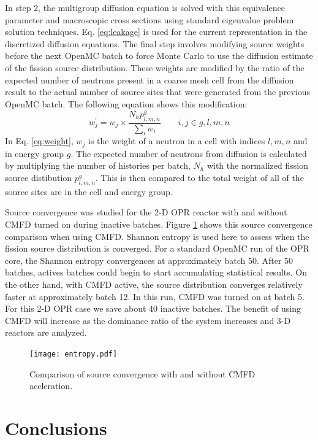 \documentclass{ansconf}
\begin{document}
In step 2, the multigroup diffusion equation is solved with this equivalence
parameter and macroscopic cross sections using standard eigenvalue problem
solution techniques. Eq. \ref{eq:leakage} is used for the current representation in 
the discretized diffusion equations. The final step involves modifying source weights 
before the next OpenMC batch to force Monte Carlo to use the diffusion estimate of the
fission source distribution. These weights are modified by the ratio of the
expected number of neutrons present in a coarse mesh cell from the diffusion
result to the actual number of source sites that were generated from the
previous OpenMC batch. The following equation shows this modification:
\begin{equation}
  \label{eq:weight}
  w_{j}^{\prime} = w_{j} \times \frac{N_{h}p_{l,m,n}^{g}}{\sum_{i}w_{i}} \qquad
  i,j\in g,l,m,n
\end{equation}
In Eq. \ref{eq:weight}, $w_{j}$ is the weight of a neutron in a cell with indices 
$l,m,n$ and in energy group $g$. The expected number of neutrons from diffusion is
calculated by multiplying the number of histories per batch, $N_{h}$ with the
normalized fission source distibution $p_{l,m,n}^{g}$. This is then compared to
the total weight of all of the source sites are in the cell and energy group.

Source convergence was studied for the 2-D OPR reactor with and without CMFD
turned on during inactive batches.  Figure \ref{fig:cmfd} shows this source
convergence comparison when using CMFD. Shannon entropy is used here to assess
when the fission source distribution is converged.  For a standard OpenMC run of
the OPR core, the Shannon entropy convergences at approximately batch 50. After
50 batches, actives batches could begin to start accumulating statistical
results. On the other hand, with CMFD active, the source distribution converges
relatively faster at approximately batch 12. In this run, CMFD was turned on at
batch 5.  For this 2-D OPR case we save about 40 inactive batches. The benefit
of using CMFD will increase as the dominance ratio of the system increases and
3-D reactors are analyzed.

\begin{figure}[!t]
  \centering
  \texttt{[image: entropy.pdf]}
  \caption{Comparison of source convergence with and without CMFD accleration.}
  \label{fig:cmfd}
\end{figure}  

\section{Conclusions}
\end{document}

